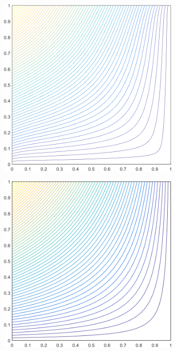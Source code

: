 \begin{figure}
\begin{subfigure}[b]{0.39\textwidth}
		\caption{}
	\end{subfigure}
	\vfill
	\begin{subfigure}[b]{0.39\textwidth}
		\centering
		\includegraphics[width=\textwidth]{figures/sec_BF/square_MV1_contour_b4.png}
		\caption{}
	\end{subfigure}
	\hspace{1.5cm}
	\begin{subfigure}[b]{0.39\textwidth}
		\centering
		\includegraphics[width=\textwidth]{figures/sec_BF/square_MAXENT1_contour_b4.png}

\end{subfigure}
\end{figure}
